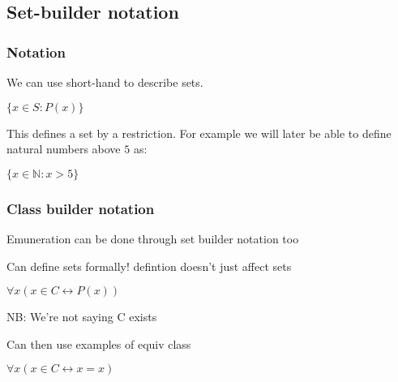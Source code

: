 
\subsection{Set-builder notation}

\subsubsection{Notation}

We can use short-hand to describe sets.

\(\{x\in S: P(x)\}\)

This defines a set by a restriction. For example we will later be able to define natural numbers above \(5\) as:

\(\{x\in \mathbb{N} : x>5\}\)

\subsubsection{Class builder notation}

Emuneration can be done through set builder notation too

Can define sets formally! defintion doesn't just affect sets

\(\forall x (x\in C \leftrightarrow P(x))\)

NB: We're not saying C exists

Can then use examples of equiv class

\(\forall x (x\in C \leftrightarrow x=x)\)

